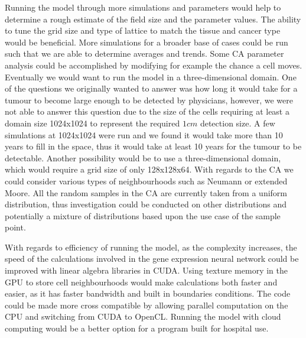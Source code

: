 \documentclass[\main/thesis.tex]{subfiles}
\begin{document}
Running the model through more simulations and parameters would help to determine a rough estimate of the field size and the parameter values. The ability to tune the grid size and type of lattice to match the tissue and cancer type would be beneficial. More simulations for a broader base of cases could be run such that we are able to determine averages and trends. Some CA parameter analysis could be accomplished by modifying for example the chance a cell moves. Eventually we would want to run the model in a three-dimensional domain. One of the questions we originally wanted to answer was how long it would take for a tumour to become large enough to be detected by physicians, however, we were not able to answer this question due to the size of the cells requiring at least a domain size 1024x1024 to represent the required $1 cm$ detection size. A few simulations at 1024x1024 were run and we found it would take more than 10 years to fill in the space, thus it would take at least 10 years for the tumour to be detectable. Another possibility would be to use a three-dimensional domain, which would require a grid size of only 128x128x64. With regards to the CA we could consider various types of neighbourhoods such as Neumann or extended Moore. All the random samples in the CA are currently taken from a uniform distribution, thus investigation could be conducted on other distributions and potentially a mixture of distributions based upon the use case of the sample point.

With regards to efficiency of running the model, as the complexity increases, the speed of the calculations involved in the gene expression neural network could be improved with linear algebra libraries in CUDA. Using texture memory in the GPU to store cell neighbourhoods would make calculations both faster and easier, as it has faster bandwidth and built in boundaries conditions. The code could be made more cross compatible by allowing parallel computation on the CPU and switching from CUDA to OpenCL. Running the model with cloud computing would be a better option for a program built for hospital use.
\end{document}
